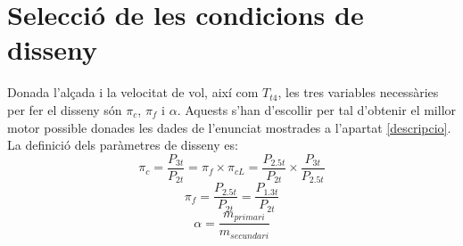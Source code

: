 \section{Selecció de les condicions de disseny}
Donada l'alçada i la velocitat de vol, així com $T_{t4}$, les tres variables necessàries per fer el disseny són $\pi_c$, $\pi_f$ i $\alpha$. Aquests s'han d'escollir per tal d'obtenir el millor motor possible donades les dades de l'enunciat mostrades a l'apartat \ref{descripcio}.
La definició dels paràmetres de disseny es:
\begin{equation*}
	\pi_c = \frac{P_{3t}}{P_{2t}} = \pi_{f}\times\pi_{cL} = \frac{P_{2.5t}}{P_{2t}} \times \frac{P_{3t}}{P_{2.5t}}
\end{equation*}
\begin{equation*}
	\pi_f = \frac{P_{2.5t}}{P_{2t}} = \frac{P_{1.3t}}{P_{2t}} 
\end{equation*}
\begin{equation*}
	\alpha = \frac{m_{primari}}{m_{secundari}}
\end{equation*}

